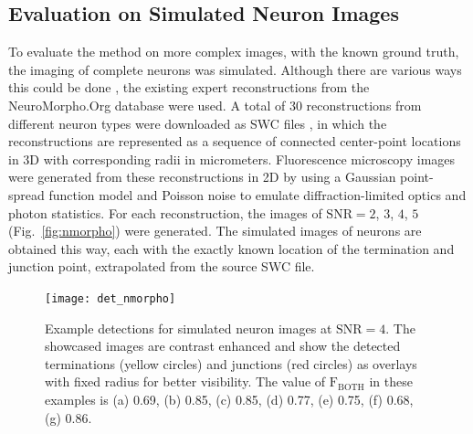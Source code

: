 \subsection{Evaluation on Simulated Neuron Images}
\label{subsec:experiments-simulated}
To evaluate the method on more complex images, with the known ground truth, the imaging of complete neurons was simulated. Although there are various ways this could be done \cite{koene2009netmorph, vasilkoski2009detection}, the existing expert reconstructions from the NeuroMorpho.Org database \cite{ascoli2007neuromorpho} were used. A total of 30 reconstructions from different neuron types were downloaded as SWC files \cite{cannon1998line}, in which the reconstructions are represented as a sequence of connected center-point locations in 3D with corresponding radii in micrometers. Fluorescence microscopy images were generated from these reconstructions in 2D by using a Gaussian point-spread function model and Poisson noise to emulate diffraction-limited optics and photon statistics. For each reconstruction, the images of $\textrm{SNR}=2$, $3$, $4$, $5$ (Fig.~\ref{fig:nmorpho}) were generated. The simulated images of neurons are obtained this way, each with the exactly known location of the termination and junction point, extrapolated from the source SWC file.

\begin{figure}%
	\centering
		\texttt{[image: det\_nmorpho]}
			\caption{Example detections for simulated neuron images at $\textrm{SNR}=4$. The showcased images are contrast enhanced and show the detected terminations (yellow circles) and junctions (red circles) as overlays with fixed radius for better visibility. The value of $\textrm{F}_\textrm{BOTH}$ in these examples is (a) 0.69, (b) 0.85, (c) 0.85, (d) 0.77, (e) 0.75, (f) 0.68, (g) 0.86.}
	\label{fig:det-syn}
\end{figure}

